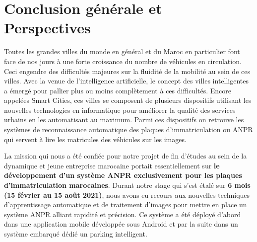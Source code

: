 \chapter*{Conclusion générale et Perspectives}
Toutes les grandes villes du monde en général et du Maroc en particulier font face de nos jours à une forte croissance du nombre de véhicules en circulation. Ceci engendre des difficultés majeures sur la fluidité de la mobilité au sein de ces villes. Avec la venue de l’intelligence artificielle, le concept des villes intelligentes a émergé pour pallier plus ou moins complètement à ces difficultés. Encore appelées Smart Cities, ces villes se composent de plusieurs dispositifs utilisant les nouvelles technologies en informatique pour améliorer la qualité des services urbains en les automatisant au maximum. Parmi ces dispositifs on retrouve les systèmes de reconnaissance automatique des plaques d’immatriculation  ou ANPR qui servent à lire les matricules des véhicules sur les images. 


La mission qui nous a été confiée pour notre projet de fin d’études au sein de la dynamique et jeune entreprise marocaine portait essentiellement sur \textbf{le développement d’un système ANPR exclusivement pour les plaques d’immatriculation marocaines}. Durant notre stage qui s’est étalé sur \textbf{6 mois (15 février au 15 août 2021)}, nous avons eu recours aux nouvelles techniques d’apprentissage automatique et de traitement d’images  pour mettre en place un système ANPR alliant rapidité et précision. Ce système a été déployé d’abord dans une application mobile développée sous Android et par la suite dans un système embarqué dédié un parking intelligent.


